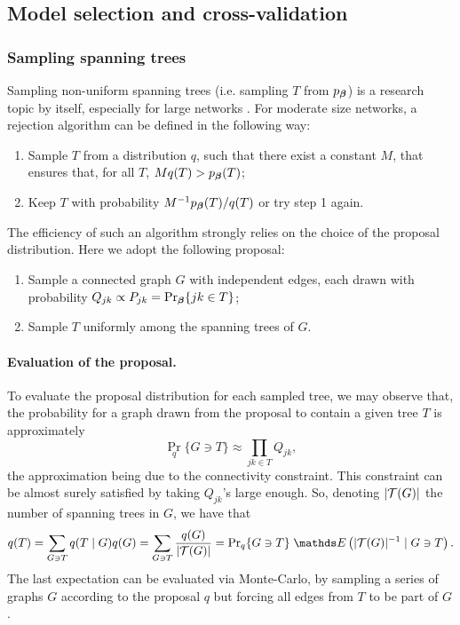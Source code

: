 \tocless\subsection{Model selection and cross-validation} \label{sec:modSel}

\subsubsection{Sampling spanning trees} \label{eq:sampTree}
Sampling non-uniform spanning trees (i.e. sampling $T$ from $p_{\boldsymbol{\beta}}$) is a research topic by itself, especially for large networks \citep[see][for a review]{DKP17}. For moderate size networks, a rejection algorithm \citep{Dev86} can be defined in the following way:
\begin{enumerate}
\item Sample $T$ from a distribution $q$, such that there exist a constant $M$, that ensures that, for all $T$, $M q(T) > p_{\boldsymbol{\beta}}(T)$;
\item Keep $T$ with probability $M^{-1} p_{\boldsymbol{\beta}}(T) / q(T)$ or try step 1 again.
\end{enumerate}
The efficiency of such an algorithm strongly relies on the choice of the proposal distribution. Here we adopt the following proposal:
\begin{enumerate}[label=\roman*]
\item Sample a connected graph $G$ with independent edges, each drawn with probability $Q_{jk} \propto P_{jk} = \Pr_{\boldsymbol{\beta}}\{ jk \in T\}$; 
\item Sample $T$ uniformly among the spanning trees of $G$.
\end{enumerate}
%
\paragraph{Evaluation of the proposal.}
To evaluate the proposal distribution for each sampled tree, we may observe that, the probability for a graph drawn from the proposal to contain a given tree $T$ is approximately
$$
{\Pr}_q\{G \ni T\} \approx \prod_{jk \in T} Q_{jk},
$$
the approximation being due to the connectivity constraint. This constraint can be almost surely satisfied by taking $Q_{jk}$'s large enough. So, denoting $|{\mathcal{T}}(G)|$ the number of spanning trees in $G$, we have that
\begin{align*}
q(T) 
= \sum_{G \ni T} q(T \mid G) q(G)  = \sum_{G \ni T} \frac{q(G)}{|\Tcal(G)|} 
= {\Pr}_q\{G \ni T\} \; \Esp\left(|\Tcal(G)|^{-1} \mid G \ni T \right).
\end{align*}
The last expectation can be evaluated via Monte-Carlo, by sampling a series of graphs $G$ according to the proposal $q$ but forcing all edges from $T$ to be part of $G$. 
%
